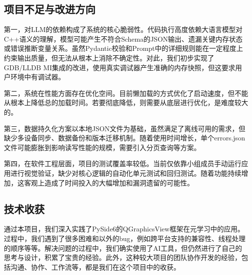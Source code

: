 \documentclass[12pt,a4paper]{ctexart}
\begin{document}
\subsection{项目不足与改进方向}

第一，对LLM的依赖构成了系统的核心脆弱性。代码执行高度依赖大语言模型对C++语义的理解，模型可能产生不符合Schema的JSON输出、遗漏关键内存状态或错误推断变量关系。虽然Pydantic校验和Prompt中的详细规则能在一定程度上约束输出质量，但无法从根本上消除不确定性。对此，我们初步实现了GDB/LLDB MI集成的改进，使用真实调试器产生准确的内存快照，但这要求用户环境中有调试器。

第二，系统在性能方面存在优化空间。目前懒加载的方式优化了启动速度，但不能从根本上降低总的加载时间。若要彻底降低，则需要从底层进行优化，是难度较大的。

第三，数据持久化方案以本地JSON文件为基础，虽然满足了离线可用的需求，但缺少多设备同步、数据备份和版本迁移机制。随着使用时间增长，单个errors.json文件可能膨胀到影响读写性能的规模，需要引入分页查询等方案。

第四，在软件工程层面，项目的测试覆盖率较低。当前仅依靠小组成员手动运行应用进行视觉验证，缺少对核心逻辑的自动化单元测试和回归测试。随着功能持续增加，这客观上造成了时间投入的大幅增加和漏洞遗留的可能性。

\subsection{技术收获}

通过本项目，我们深入实践了PySide6的QGraphicsView框架在元学习中的应用。过程中，我们遇到了很多困难和以外的bug，例如跨平台支持的兼容性、线程处理的顺序等等。解决问题的过程中，我们确实使用了AI工具，但仍然进行了自己的思考与设计，积累了宝贵的经验。此外，这种较大项目的团队协作开发的经验，包括沟通、协作、工作流等，都是我们在这个项目中的收获。
\end{document}
